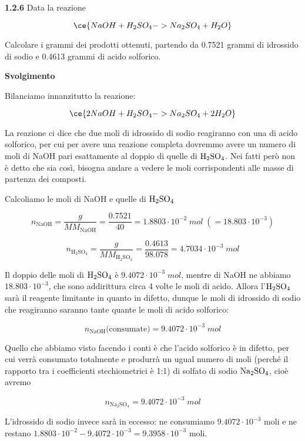 \vspace{0.2cm}\textbf{1.2.6} Data la reazione

$$\ce{NaOH + H_2SO_4 -> Na_2SO_4 + H_2O}$$

Calcolare i grammi dei prodotti ottenuti, partendo da 0.7521 grammi di idrossido di sodio e 0.4613 grammi di acido solforico.

\vspace{0.2cm}\large\textbf{Svolgimento}\normalsize

\vspace{0.2cm}Bilanciamo innanzitutto la reazione:

$$\ce{2NaOH + H_2SO_4 -> Na_2SO_4 + 2H_2O}$$

La reazione ci dice che due moli di idrossido di sodio reagiranno con una di acido solforico, per cui per avere una reazione completa dovremmo avere un numero di moli di NaOH pari esattamente al doppio di quelle di $\rm H_2SO_4$. Nei fatti però non è detto che sia così, bisogna andare a vedere le moli corrispondenti alle masse di partenza dei composti.

Calcoliamo le moli di NaOH e quelle di $\rm H_2SO_4$

$$n_{\text{NaOH}}=\frac{g}{MM_{\text{NaOH}}}=\frac{0.7521}{40}=1.8803 \cdot 10^{-2}\;mol\;(=18.803 \cdot 10^{-3})$$

$$n_{\text{H}_2\text{SO}_4}=\frac{g}{MM_{\text{H}_2\text{SO}_4}}=\frac{0.4613}{98.078}=4.7034 \cdot 10^{-3}\;mol$$

Il doppio delle moli di $\rm H_2SO_4$ è $9.4072 \cdot 10^{-3}\;mol$, mentre di NaOH ne abbiamo $18.803 \cdot 10^{-3}$, che sono addirittura circa 4 volte le moli di acido. Allora l'$\rm H_2SO_4$ sarà il reagente limitante in quanto in difetto, dunque le moli di idrossido di sodio che reagiranno saranno tante quante le moli di acido solforico:

$$n_{\text{NaOH}}\text{(consumate)}=9.4072 \cdot 10^{-3}\;mol$$

Quello che abbiamo visto facendo i conti è che l'acido solforico è in difetto, per cui verrà consumato totalmente e produrrà un ugual numero di moli (perché il rapporto tra i coefficienti stechiometrici è 1:1) di solfato di sodio $\rm Na_2SO_4$, cioè avremo

$$n_{\text{Na}_2\text{SO}_4}=9.4072 \cdot 10^{-3}\;mol$$

L'idrossido di sodio invece sarà in eccesso: ne consumiamo $9.4072 \cdot 10^{-3}$ moli e ne restano $1.8803 \cdot 10^{-2} - 9.4072 \cdot 10^{-3}=9.3958 \cdot 10^{-3}$ moli.


